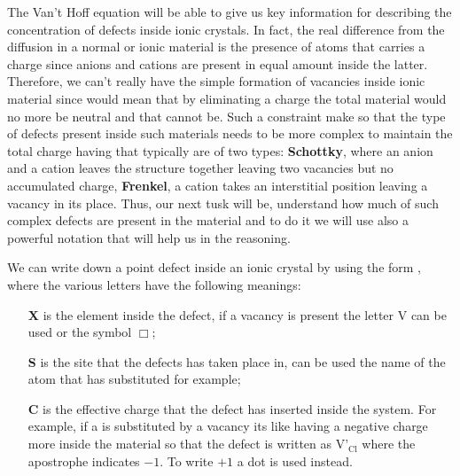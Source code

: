 The Van't Hoff equation will be able to give us key information for describing the concentration of defects inside ionic crystals. In fact, the real difference from the diffusion in a normal or ionic material is the presence of atoms that carries a charge since anions and cations are present in equal amount inside the latter. Therefore, we can't really have the simple formation of vacancies inside ionic material since would mean that by eliminating a charge the total material would no more be neutral and that cannot be. Such a constraint make so that the type of defects present inside such materials needs to be more complex to maintain the total charge having that typically are of two types: \textbf{Schottky}, where an anion and a cation leaves the structure together leaving two vacancies but no accumulated charge, \textbf{Frenkel}, a cation takes an interstitial position leaving a vacancy in its place. Thus, our next tusk will be, understand how much of such complex defects are present in the material and to do it we will use also a powerful notation that will help us in the reasoning.
{
    We can write down a point defect inside an ionic crystal by using the form , where the various letters have the following meanings:
    \begin{itemize}[align=left, leftmargin=*]
        \item[\textbf{X}] is the element inside the defect, if a vacancy is present the letter V can be used or the symbol $\Box$;
        \item[\textbf{S}] is the site that the defects has taken place in, can be used the name of the atom that has substituted for example;
        \item[\textbf{C}] is the effective charge that the defect has inserted inside the system. For example, if a  is substituted by a vacancy its like having a negative charge more inside the material so that the defect is written as $\text{V'}_{\text{Cl}}$ where the apostrophe indicates $-1$. To write $+1$ a dot is used instead.  
    \end{itemize}
}